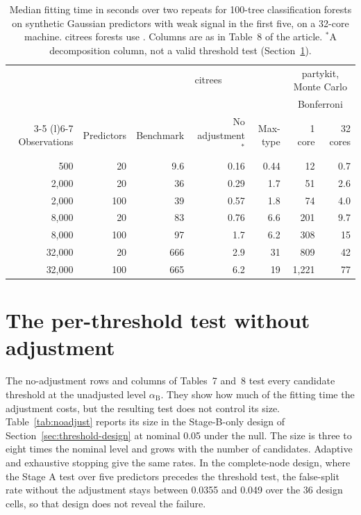 \documentclass[11pt]{article}
\newcommand{\pkg}[1]{{\normalfont\fontseries{b}\selectfont #1}}
\newcommand{\code}[1]{\texttt{\detokenize{#1}}}
\newcommand{\citrees}{\pkg{citrees}\xspace}
\begin{document}
\begin{table}[t!]
\centering
\small
\setlength{\tabcolsep}{4pt}
\begin{tabular}{rrrrrrr}
\toprule
 & & \multicolumn{3}{c}{\citrees} & \multicolumn{2}{c}{\pkg{partykit}, Monte Carlo} \\
 & & & & & \multicolumn{2}{c}{Bonferroni} \\
\cmidrule(lr){3-5} \cmidrule(l){6-7}
Observations & Predictors & Benchmark & No adjustment$^{\ast}$ & Max-type & 1 core & 32 cores \\ \midrule
500 & 20 & 9.6 & 0.16 & 0.44 & 12 & 0.7 \\
2,000 & 20 & 36 & 0.29 & 1.7 & 51 & 2.6 \\
2,000 & 100 & 39 & 0.57 & 1.8 & 74 & 4.0 \\
8,000 & 20 & 83 & 0.76 & 6.6 & 201 & 9.7 \\
8,000 & 100 & 97 & 1.7 & 6.2 & 308 & 15 \\
32,000 & 20 & 666 & 2.9 & 31 & 809 & 42 \\
32,000 & 100 & 665 & 6.2 & 19 & 1,221 & 77 \\
\bottomrule
\end{tabular}
\caption{Median fitting time in seconds over two repeats for 100-tree
classification forests on synthetic Gaussian predictors with weak signal in
the first five, on a 32-core machine. \citrees forests use
\code{n_jobs = -1}. Columns are as in Table~8 of the article.
$^{\ast}$A decomposition column, not a valid threshold test
(Section~\ref{sec:noadjust}).}
\label{tab:performance-scaling}
\end{table}

\section{The per-threshold test without adjustment} \label{sec:noadjust}

The no-adjustment rows and columns of Tables~7 and~8 test every candidate
threshold at the unadjusted level $\alpha_{\mathrm{B}}$. They show how much of
the fitting time the adjustment costs, but the resulting test does not control
its size. Table~\ref{tab:noadjust} reports its size in the Stage-B-only design
of Section~\ref{sec:threshold-design} at nominal 0.05 under the null. The size
is three to eight times the nominal level and grows with the number of
candidates. Adaptive and exhaustive stopping give the same rates. In the
complete-node design, where the Stage A test over five predictors precedes the
threshold test, the false-split rate without the adjustment stays between
0.0355 and 0.049 over the 36 design cells, so that design does not reveal the
failure.
\end{document}
